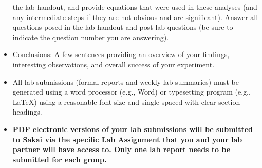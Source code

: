 \begin{itemize}
            the lab handout, and provide equations that were used in these
            analyses (and any intermediate steps if they are not obvious and
            are significant).  Answer all questions posed in the lab handout
            and post-lab questions (be sure to indicate the question number you
            are answering).  
        \item \underline{Conclusions}: A few sentences providing an overview of
            your findings, interesting observations, and overall success of
            your experiment.
    \item All lab submissions (formal reports and weekly lab summaries) must be generated using a word processor (e.g., Word) or
        typesetting program (e.g., \LaTeX) using a reasonable font size and
        single-spaced with clear section headings.
    \item {\bf PDF electronic versions of your lab submissions 
will be submitted to
            Sakai via the specific Lab Assignment that you and your lab partner
            will have access to.  Only one lab report needs to be submitted for
            each group.}
\end{itemize}
